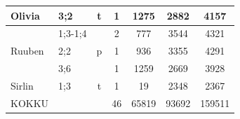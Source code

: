 \documentclass[12pt]{article}
\begin{document}
\begin{table}[H]
{\begin{tabular}{|l|l|c|c|c|c|c|}
Olivia                   & 3;2        & t                         & 1                               & 1275                             & 2882                              & 4157                       \\ \hline
\multirow{3}{*}{Ruuben}  & 1;3-1;4    & \multirow{3}{*}{p}        & 2                               & 777                              & 3544                              & 4321                       \\ \cline{2-2} \cline{4-7} 
                         & 2;2        &                           & 1                               & 936                              & 3355                              & 4291                       \\ \cline{2-2} \cline{4-7} 
                         & 3;6        &                           & 1                               & 1259                             & 2669                              & 3928                       \\ \hline
Sirlin                   & 1;3        & t                         & 1                               & 19                               & 2348                              & 2367                       \\ \hline\hline
KOKKU                    & \multicolumn{2}{l|}{}                  & 46                              & 65819                            & 93692                             & 159511                     \\ \hline
\end{tabular}}
\end{table}
\hfill

\begin{table}[H]
\centering
\caption{Beeki korpus}
\end{table}
\end{document}
